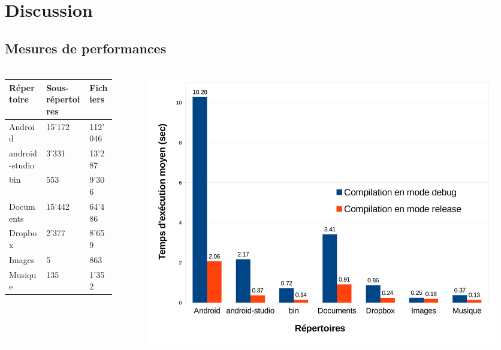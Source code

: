 \documentclass[10pt]{beamer}
\begin{document}
\section{Discussion}
\subsection{Mesures de performances}
\begin{frame}
    \frametitle{\subsecname}
    \begin{columns}[T]
        \begin{column}{.35\textwidth}
        \fontsize{6pt}{8}\selectfont
            \begin{tabularx}{4cm}{|p{1cm}|p{1cm}|X|} \hline
                \textbf{Répertoire} & \textbf{Sous-répertoires} & \textbf{Fichiers} \\ \hline
                Android & 15'172 & 112'046 \\ \hline
                android-studio & 3'331 & 13'287 \\ \hline
                bin & 553 & 9'306 \\ \hline
                Documents & 15'442 & 64'486 \\ \hline
                Dropbox & 2'377 & 8'659 \\ \hline
                Images & 5 & 863 \\ \hline
                Musique & 135 & 1'352 \\ \hline
            \end{tabularx}
        \end{column}
        \pause
        \begin{column}{.65\textwidth}
            \begin{figure}
                \begin{center}
                    \includegraphics[width=1\textwidth]{images/histo.png}
                \end{center}
            \end{figure}
        \end{column}
    \end{columns}
\end{frame}
\end{document}
